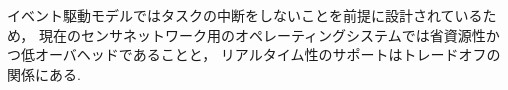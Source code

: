 イベント駆動モデルではタスクの中断をしないことを前提に設計されているため，
現在のセンサネットワーク用のオペレーティングシステムでは省資源性かつ低オーバヘッドであることと，
リアルタイム性のサポートはトレードオフの関係にある.






